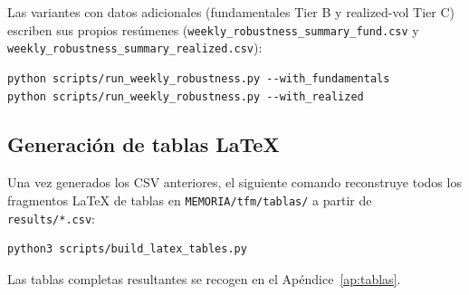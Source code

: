 Las variantes con datos adicionales (fundamentales Tier B y realized-vol Tier C)
escriben sus propios resúmenes
(\texttt{weekly\_robustness\_summary\_fund.csv} y
\texttt{weekly\_robustness\_summary\_realized.csv}):

\begin{verbatim}
python scripts/run_weekly_robustness.py --with_fundamentals
python scripts/run_weekly_robustness.py --with_realized
\end{verbatim}

\subsection{Generación de tablas LaTeX}

Una vez generados los CSV anteriores, el siguiente comando reconstruye todos los
fragmentos LaTeX de tablas en \texttt{MEMORIA/tfm/tablas/} a partir de
\texttt{results/*.csv}:

\begin{verbatim}
python3 scripts/build_latex_tables.py
\end{verbatim}

Las tablas completas resultantes se recogen en el Apéndice~\ref{ap:tablas}.
